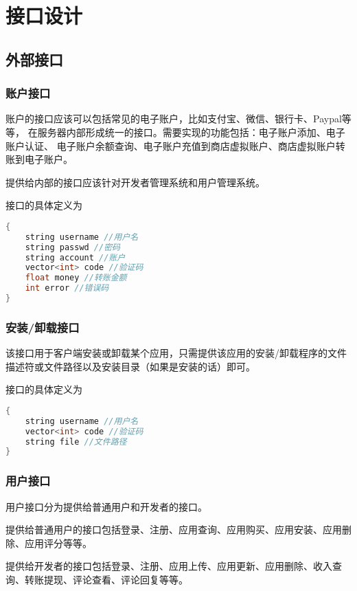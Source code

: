 \chapter{接口设计}
\section{外部接口}

\subsection{账户接口}
账户的接口应该可以包括常见的电子账户，比如支付宝、微信、银行卡、Paypal等等，
在服务器内部形成统一的接口。需要实现的功能包括：电子账户添加、电子账户认证、
电子账户余额查询、电子账户充值到商店虚拟账户、商店虚拟账户转账到电子账户。

提供给内部的接口应该针对开发者管理系统和用户管理系统。

{\color{red}
	接口的具体定义为
	
\begin{lstlisting}[language=C, caption=账户接口, label={code:first-code}]
{
	string username //用户名
	string passwd //密码
	string account //账户
	vector<int> code //验证码
	float money //转账金额
	int error //错误码
}
\end{lstlisting}
}


\subsection{安装/卸载接口}
该接口用于客户端安装或卸载某个应用，只需提供该应用的安装/卸载程序的文件描述符或文件路径以及安装目录（如果是安装的话）即可。

{\color{red}
	接口的具体定义为
	
\begin{lstlisting}[language=C, caption=安装/卸载接口, label={code:first-code}]
{
	string username //用户名
	vector<int> code //验证码
	string file //文件路径
}	
\end{lstlisting}
}

\subsection{用户接口}
用户接口分为提供给普通用户和开发者的接口。

提供给普通用户的接口包括登录、注册、应用查询、应用购买、应用安装、应用删除、应用评分等等。

提供给开发者的接口包括登录、注册、应用上传、应用更新、应用删除、收入查询、转账提现、评论查看、评论回复等等。


